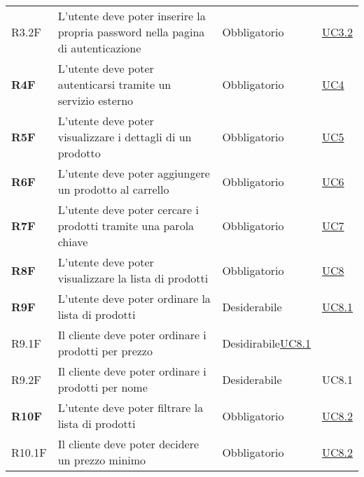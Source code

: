 \begin{center}
\begin{longtable}[!h]{p{50px} p{210px} p{80px} p{50px}}
        R3.2F                                           & L'utente deve poter inserire la propria password nella pagina di autenticazione                  & Obbligatorio             & \hyperref[sec:UC3]{UC3.2}     \\
        \textbf{R4F}                                    & L'utente deve poter autenticarsi tramite un servizio esterno                                     & Obbligatorio             & \hyperref[sec:UC4]{UC4}       \\
        \textbf{R5F}                                    & L'utente deve poter visualizzare i dettagli di un prodotto                                       & Obbligatorio             & \hyperref[sec:UC5]{UC5}       \\
        \textbf{R6F}                                    & L'utente deve poter aggiungere un prodotto al carrello                                           & Obbligatorio             & \hyperref[sec:UC6]{UC6}       \\
        \textbf{R7F}                                    & L'utente deve poter cercare i prodotti tramite una parola chiave                                 & Obbligatorio             & \hyperref[sec:UC7]{UC7}       \\
        \textbf{R8F}                                    & L'utente deve poter visualizzare la lista di prodotti                                            & Obbligatorio             & \hyperref[sec:UC8]{UC8}       \\
        \textbf{R9F}                                    & L'utente deve poter ordinare la lista di prodotti                                                & Desiderabile             & \hyperref[sec:UC8]{UC8.1}     \\
        R9.1F                                           & Il cliente deve poter ordinare i prodotti per prezzo & Desidirabile\hyperref[sec:UC8]{UC8.1}\\
        R9.2F                                           & Il cliente deve poter ordinare i prodotti per nome & Desiderabile & UC8.1\\
        \textbf{R10F}                                   & L'utente deve poter filtrare la lista di prodotti                                                & Obbligatorio             & \hyperref[sec:UC8]{UC8.2}     \\
        R10.1F                                          & Il cliente deve poter decidere un prezzo minimo & Obbligatorio & \hyperref[sec:UC8]{UC8.2} \\

\end{longtable}
\end{center}
